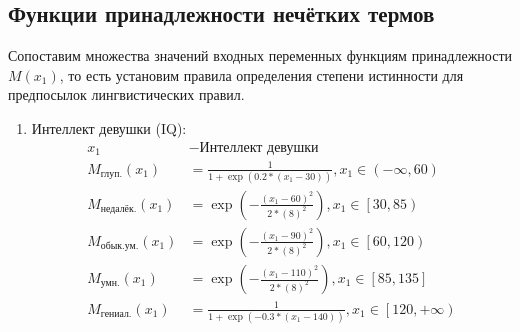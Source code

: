 \documentclass[12pt, a4paper]{article}
\begin{document}
\subsection{Функции принадлежности нечётких термов}
Сопоставим множества значений входных переменных функциям принадлежности $M(x_1)$, то есть установим правила определения степени истинности для предпосылок лингвистических правил.

\begin{enumerate}
\item Интеллект девушки (IQ):
\begin{equation*}
\begin{aligned}
x_1 &- \text{Интеллект девушки}\\
M_{\text{глуп.}}(x_1) &= \frac{1}{1+\exp \left( 0.2 * (x_1-30) \right)}, x_1\in \left(-\infty, 60\right)\\
M_{\text{недалёк.}}(x_1) &= \exp{\left( -\frac{(x_1-60)^2}{2 * (8)^2}  \right)}, x_1\in \left[30,85\right)\\
M_{\text{обык.ум.}}(x_1) &= \exp{\left( -\frac{(x_1-90)^2}{2 * (8)^2}  \right)}, x_1\in \left[60, 120\right)\\
M_{\text{умн.}}(x_1) &= \exp{\left( -\frac{(x_1-110)^2}{2 * (8)^2}  \right)}, x_1\in \left[85, 135\right]\\
M_{\text{гениал.}}(x_1) &= \frac{1}{1+\exp \left( -0.3 * (x_1-140) \right)}, x_1\in \left[120, +\infty\right)\\
\end{aligned}
\end{equation*}
\begin{center}
\begin{figure}[H]
\end{figure}
\end{center}
\end{enumerate}
\end{document}
